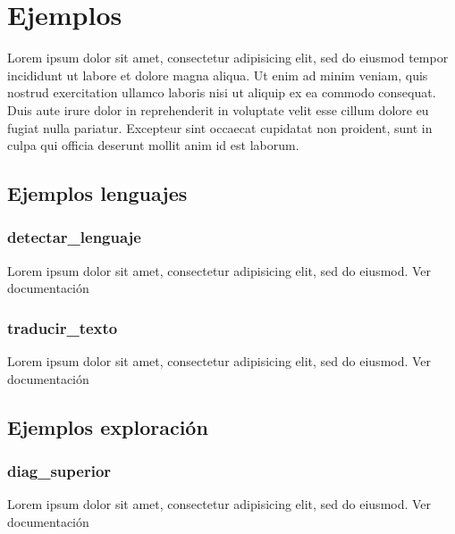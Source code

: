 \documentclass[letterpaper,10pt,openany,spanish]{sphinxmanual}
\begin{document}
\chapter{Ejemplos}
\label{\detokenize{seccion_ejemplos:ejemplos}}\label{\detokenize{seccion_ejemplos:seccion-ejemplos}}\label{\detokenize{seccion_ejemplos::doc}}
Lorem ipsum dolor sit amet, consectetur adipisicing elit, sed do eiusmod
tempor incididunt ut labore et dolore magna aliqua. Ut enim ad minim veniam,
quis nostrud exercitation ullamco laboris nisi ut aliquip ex ea commodo
consequat. Duis aute irure dolor in reprehenderit in voluptate velit esse
cillum dolore eu fugiat nulla pariatur. Excepteur sint occaecat cupidatat non
proident, sunt in culpa qui officia deserunt mollit anim id est laborum.


\section{Ejemplos \sphinxhyphen{} lenguajes}
\label{\detokenize{seccion_ejemplos:ejemplos-lenguajes}}

\subsection{detectar\_lenguaje}
\label{\detokenize{seccion_ejemplos:detectar-lenguaje}}
Lorem ipsum dolor sit amet, consectetur adipisicing elit, sed do eiusmod. Ver documentación {\hyperref[\detokenize{funciones/lenguajes:lenguajes.detectar_lenguaje}]{}}


\subsection{traducir\_texto}
\label{\detokenize{seccion_ejemplos:traducir-texto}}
Lorem ipsum dolor sit amet, consectetur adipisicing elit, sed do eiusmod. Ver documentación {\hyperref[\detokenize{funciones/lenguajes:lenguajes.traducir_texto}]{}}


\section{Ejemplos \sphinxhyphen{} exploración}
\label{\detokenize{seccion_ejemplos:ejemplos-exploracion}}

\subsection{diag\_superior}
\label{\detokenize{seccion_ejemplos:diag-superior}}
Lorem ipsum dolor sit amet, consectetur adipisicing elit, sed do eiusmod. Ver documentación 
\end{document}
